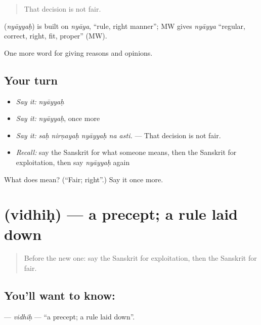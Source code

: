 \begin{quote}
That decision is not fair.
\end{quote}

\begin{cousinweb}
\textbf{} (\emph{nyāyyaḥ}) is built on \emph{nyāya}, \textquotedblleft{}rule, right manner\textquotedblright{}; MW gives \emph{nyāyya} \textquotedblleft{}regular, correct, right, fit, proper\textquotedblright{} (MW).
\end{cousinweb}

\begin{grammarlens}[title={What you've built}]
One more word for giving reasons and opinions.
\end{grammarlens}

\subsection*{Your turn}
\begin{itemize}
\raggedright
  \item \emph{Say it:} \emph{nyāyyaḥ}
  \item \emph{Say it:} \emph{nyāyyaḥ}, once more
  \item \emph{Say it:} \emph{saḥ nirṇayaḥ nyāyyaḥ na asti.} — That decision is not fair.
  \item \emph{Recall:} say the Sanskrit for what someone means, then the Sanskrit for exploitation, then say \emph{nyāyyaḥ} again
\end{itemize}

\begin{tcolorbox}[breakable,colback=teal!4,colframe=teal!35!black,title={Before you move on}]
What does  mean? (\textquotedblleft{}Fair; right\textquotedblright{}.) Say it once more.
\end{tcolorbox}
\section[\texorpdfstring{\sk{विधिः} (vidhiḥ)}{विधिः (vidhiḥ)}]{ (vidhiḥ) — a precept; a rule laid down}

\label{lesson:SA-C348-vidhih}



\begin{quote}
Before the new one: say the Sanskrit for exploitation, then the Sanskrit for fair.
\end{quote}

\subsection*{You'll want to know: }
\textbf{} — \emph{vidhiḥ} — \textquotedblleft{}a precept; a rule laid down\textquotedblright{}.

